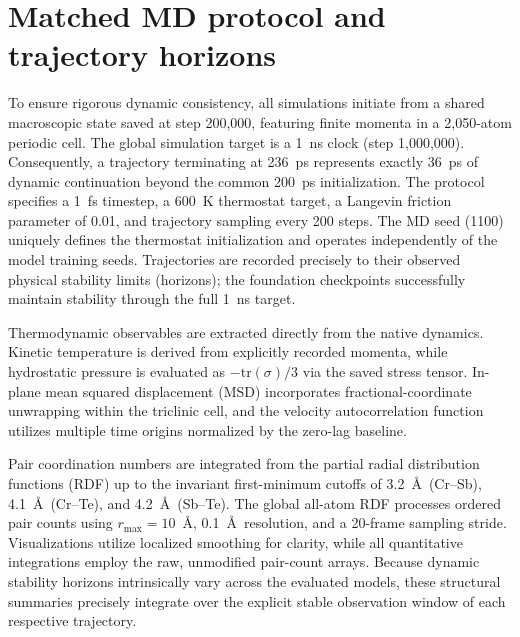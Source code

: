 \documentclass[pdflatex,sn-mathphys-num]{sn-jnl}
\begin{document}
\section{Matched MD protocol and trajectory horizons}\label{sec:md}
To ensure rigorous dynamic consistency, all simulations initiate from a shared macroscopic state saved at step 200,000, featuring finite momenta in a 2,050-atom periodic cell. The global simulation target is a 1~ns clock (step 1,000,000). Consequently, a trajectory terminating at 236~ps represents exactly 36~ps of dynamic continuation beyond the common 200~ps initialization. The protocol specifies a 1~fs timestep, a 600~K thermostat target, a Langevin friction parameter of 0.01, and trajectory sampling every 200 steps. The MD seed (1100) uniquely defines the thermostat initialization and operates independently of the model training seeds. Trajectories are recorded precisely to their observed physical stability limits (horizons); the foundation checkpoints successfully maintain stability through the full 1~ns target.

\begin{table}[htbp]
\centering\scriptsize
\caption{\textbf{Explicit MD horizons across evaluated models.} Clock times precisely track the simulated duration from the shared 200~ps initialization. Foundation entries represent distinct zero-shot checkpoints, whereas trained-family entries evaluate the dynamic variance across three independent training seeds. Evaluated horizons exactly reflect the unextrapolated limits of structural stability.}
\label{tab:md_horizons}
\resizebox{\textwidth}{!}{}
\end{table}

Thermodynamic observables are extracted directly from the native dynamics. Kinetic temperature is derived from explicitly recorded momenta, while hydrostatic pressure is evaluated as $-\mathrm{tr}(\sigma)/3$ via the saved stress tensor. In-plane mean squared displacement (MSD) incorporates fractional-coordinate unwrapping within the triclinic cell, and the velocity autocorrelation function utilizes multiple time origins normalized by the zero-lag baseline. 

Pair coordination numbers are integrated from the partial radial distribution functions (RDF) up to the invariant first-minimum cutoffs of 3.2~\AA\ (Cr--Sb), 4.1~\AA\ (Cr--Te), and 4.2~\AA\ (Sb--Te). The global all-atom RDF processes ordered pair counts using $r_{\max}=10$~\AA, 0.1~\AA\ resolution, and a 20-frame sampling stride. Visualizations utilize localized smoothing for clarity, while all quantitative integrations employ the raw, unmodified pair-count arrays. Because dynamic stability horizons intrinsically vary across the evaluated models, these structural summaries precisely integrate over the explicit stable observation window of each respective trajectory.
\end{document}
